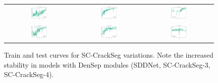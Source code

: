 \documentclass[a4paper,12pt]{report}
\begin{document}
\begin{figure}[htbp]
    \begin{tabular}{ccc}
        \includegraphics[width=0.3\textwidth]{res/crack-experiments-training-curves/sc-crackseg.pdf}   & \includegraphics[width=0.3\textwidth]{res/crack-experiments-training-curves/sddnet.pdf}        & \includegraphics[width=0.3\textwidth]{res/crack-experiments-training-curves/scmnet.pdf}        \\
        \includegraphics[width=0.3\textwidth]{res/crack-experiments-training-curves/sc-crackseg-2.pdf} & \includegraphics[width=0.3\textwidth]{res/crack-experiments-training-curves/sc-crackseg-3.pdf} & \includegraphics[width=0.3\textwidth]{res/crack-experiments-training-curves/sc-crackseg-4.pdf} \\
    \end{tabular}
    \caption{Train and test curves for SC-CrackSeg variations. Note the increased stability in models with DenSep modules (SDDNet, SC-CrackSeg-3, SC-CrackSeg-4).}
\end{figure}
\end{document}
